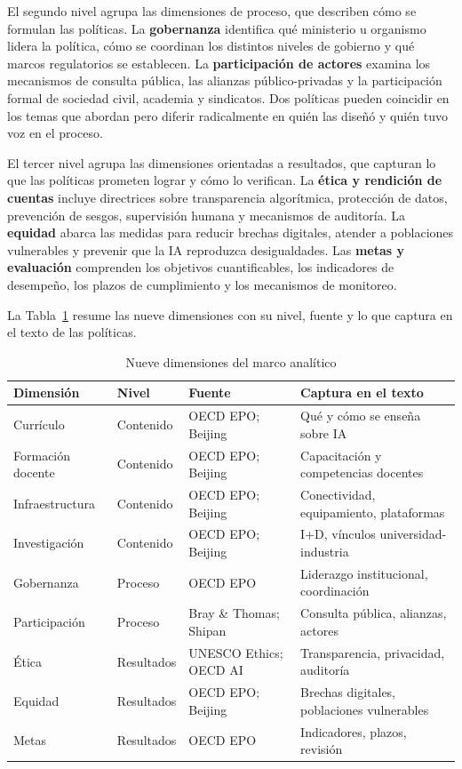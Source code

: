 El segundo nivel agrupa las dimensiones de proceso, que describen cómo se formulan las políticas. La \textbf{gobernanza} identifica qué ministerio u organismo lidera la política, cómo se coordinan los distintos niveles de gobierno y qué marcos regulatorios se establecen. La \textbf{participación de actores} examina los mecanismos de consulta pública, las alianzas público-privadas y la participación formal de sociedad civil, academia y sindicatos. Dos políticas pueden coincidir en los temas que abordan pero diferir radicalmente en quién las diseñó y quién tuvo voz en el proceso.

El tercer nivel agrupa las dimensiones orientadas a resultados, que capturan lo que las políticas prometen lograr y cómo lo verifican. La \textbf{ética y rendición de cuentas} incluye directrices sobre transparencia algorítmica, protección de datos, prevención de sesgos, supervisión humana y mecanismos de auditoría. La \textbf{equidad} abarca las medidas para reducir brechas digitales, atender a poblaciones vulnerables y prevenir que la IA reproduzca desigualdades. Las \textbf{metas y evaluación} comprenden los objetivos cuantificables, los indicadores de desempeño, los plazos de cumplimiento y los mecanismos de monitoreo.

La Tabla~\ref{tab:dimensiones} resume las nueve dimensiones con su nivel, fuente y lo que captura en el texto de las políticas.

\begin{table}[htbp]
\centering
\caption{Nueve dimensiones del marco analítico}
\label{tab:dimensiones}
\small
\begin{tabular}{llll}
\hline
\textbf{Dimensión} & \textbf{Nivel} & \textbf{Fuente} & \textbf{Captura en el texto} \\
\hline
Currículo & Contenido & OECD EPO; Beijing & Qué y cómo se enseña sobre IA \\
Formación docente & Contenido & OECD EPO; Beijing & Capacitación y competencias docentes \\
Infraestructura & Contenido & OECD EPO; Beijing & Conectividad, equipamiento, plataformas \\
Investigación & Contenido & OECD EPO; Beijing & I+D, vínculos universidad-industria \\
\hline
Gobernanza & Proceso & OECD EPO & Liderazgo institucional, coordinación \\
Participación & Proceso & Bray \& Thomas; Shipan & Consulta pública, alianzas, actores \\
\hline
Ética & Resultados & UNESCO Ethics; OECD AI & Transparencia, privacidad, auditoría \\
Equidad & Resultados & OECD EPO; Beijing & Brechas digitales, poblaciones vulnerables \\
Metas & Resultados & OECD EPO & Indicadores, plazos, revisión \\
\hline
\end{tabular}
\end{table}

